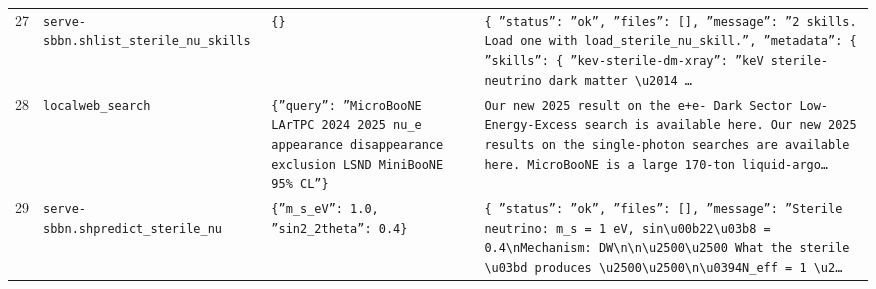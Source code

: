 \documentclass[11pt,a4paper]{article}
\begin{document}
\begin{longtable}{@{}p{}p{}p{}p{}@{}}
27 & \texttt{serve-sbbn.sh}\newline\texttt{list\_\allowbreak{}sterile\_\allowbreak{}nu\_\allowbreak{}skills} & \texttt{\{\}\allowbreak{}} & \texttt{\{   ''status'':\allowbreak{} ''ok'',\allowbreak{}   ''files'':\allowbreak{} []\allowbreak{},\allowbreak{}   ''message'':\allowbreak{} ''2 skills. Load one with load\_\allowbreak{}sterile\_\allowbreak{}nu\_\allowbreak{}skill.'',\allowbreak{}   ''metadata'':\allowbreak{} \{     ''skills'':\allowbreak{} \{       ''kev-sterile-dm-xray'':\allowbreak{} ''keV sterile-neutrino dark matter \textbackslash{}\allowbreak{}u2014 \ldots{}\allowbreak{}} \\
28 & \texttt{local}\newline\texttt{web\_\allowbreak{}search} & \texttt{\{''query'':\allowbreak{} ''MicroBooNE LArTPC 2024 2025 nu\_\allowbreak{}e appearance disappearance exclusion LSND MiniBooNE 95\% CL''\}\allowbreak{}} & \texttt{Our new 2025 result on the e+e- Dark Sector Low-Energy-Excess search is available here. Our new 2025 results on the single-photon searches are available here. MicroBooNE is a large 170-ton liquid-argo\ldots{}\allowbreak{}} \\
29 & \texttt{serve-sbbn.sh}\newline\texttt{predict\_\allowbreak{}sterile\_\allowbreak{}nu} & \texttt{\{''m\_\allowbreak{}s\_\allowbreak{}eV'':\allowbreak{} 1.0,\allowbreak{} ''sin2\_\allowbreak{}2theta'':\allowbreak{} 0.4\}\allowbreak{}} & \texttt{\{   ''status'':\allowbreak{} ''ok'',\allowbreak{}   ''files'':\allowbreak{} []\allowbreak{},\allowbreak{}   ''message'':\allowbreak{} ''Sterile neutrino:\allowbreak{} m\_\allowbreak{}s =\allowbreak{} 1 eV,\allowbreak{} sin\textbackslash{}\allowbreak{}u00b22\textbackslash{}\allowbreak{}u03b8 =\allowbreak{} 0.4\textbackslash{}\allowbreak{}nMechanism:\allowbreak{} DW\textbackslash{}\allowbreak{}n\textbackslash{}\allowbreak{}n\textbackslash{}\allowbreak{}u2500\textbackslash{}\allowbreak{}u2500 What the sterile \textbackslash{}\allowbreak{}u03bd produces \textbackslash{}\allowbreak{}u2500\textbackslash{}\allowbreak{}u2500\textbackslash{}\allowbreak{}n\textbackslash{}\allowbreak{}u0394N\_\allowbreak{}eff =\allowbreak{} 1  \textbackslash{}\allowbreak{}u2\ldots{}\allowbreak{}} \\

\end{longtable}
\end{document}
